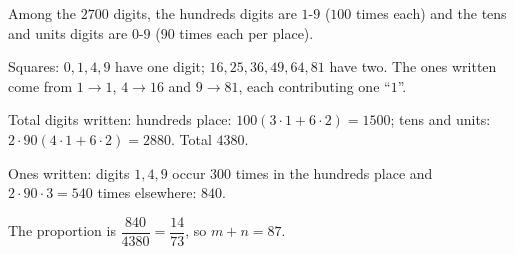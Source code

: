 Among the $2700$ digits, the hundreds digits are $1$-$9$ ($100$ times each) and the tens and units digits are $0$-$9$ ($90$ times each per place).

Squares: $0,1,4,9$ have one digit; $16,25,36,49,64,81$ have two. The ones written come from $1\to1$, $4\to16$ and $9\to81$, each contributing one ``$1$''.

Total digits written: hundreds place: $100(3\cdot1+6\cdot2)=1500$; tens and units: $2\cdot90(4\cdot1+6\cdot2)=2880$. Total $4380$.

Ones written: digits $1,4,9$ occur $300$ times in the hundreds place and $2\cdot90\cdot3=540$ times elsewhere: $840$.

The proportion is $\dfrac{840}{4380}=\dfrac{14}{73}$, so $m+n=\boxed{87}$.
